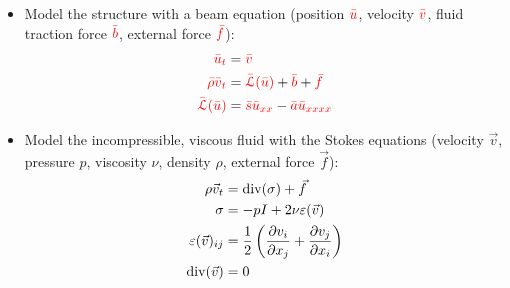 \documentclass[
paperwidth=48in,paperheight=36in,
fontscale=0.4
]{baposter}
\begin{document}
\begin{poster}
{\begin{center}
\end{center}

\begin{itemize}
    \item Model the structure with a beam equation (position \({\color{red} \bar{u}}\),
          velocity \({\color{red} \bar{v}}\), fluid traction force \({\color{red} \bar{b}}\), external
          force \({\color{red} \bar{f}}\)):
          \begin{align*}
              {\color{red} \bar{u}}_{\color{red}t}              &= {\color{red} \bar{v}}              \\
              {\color{red} \bar{\rho}} {\color{red} \bar{v}}_{\color{red}t} &= {\color{red} \bar{\mathcal{L}}(\bar{u})} +
              {\color{red} \bar{b}} + {\color{red} \bar{f}}                                           \\
              {\color{red} \bar{\mathcal{L}}(\bar{u})}  &= {\color{red} \bar{s}} {\color{red} \bar{u}}_{\color{red}xx}
              - {\color{red} \bar{a}} {\color{red} \bar{u}}_{\color{red}xxxx}
          \end{align*}

    \item Model the incompressible, viscous fluid with the Stokes equations
          (velocity \(\vec{v}\), pressure \(p\), viscosity \(\nu\), density
          \(\rho\), external force \(\vec{f}\)):
          \begin{align*}
              \rho \vec{v}_t &= \mathrm{div}(\sigma) + \vec{f}                 \\
              \sigma &= -p I + 2 \nu \varepsilon(\vec{v})                     \\
              \varepsilon(\vec{v})_{ij} &= \dfrac{1}{2}
              \left(
              \dfrac{\partial v_i}{\partial x_j} +
              \dfrac{\partial v_j}{\partial x_i}
              \right)                                                         \\
              \mathrm{div}(\vec{v}) &= 0
          \end{align*}


\end{itemize}}
\end{poster}
\end{document}
